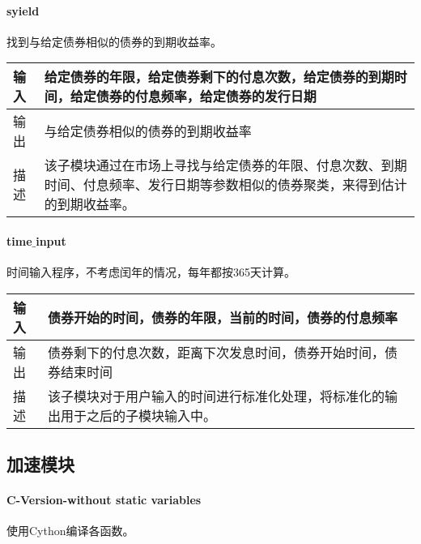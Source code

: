 \paragraph{syield}
找到与给定债券相似的债券的到期收益率。
\begin{table}[H]
\begin{adjustwidth}{-3cm}{-3cm}
\begin{center}
\begin{tabular}{|p{}| p{}|} \hline
输入 & 给定债券的年限，给定债券剩下的付息次数，给定债券的到期时间，给定债券的付息频率，给定债券的发行日期  \\ \hline
输出 & 与给定债券相似的债券的到期收益率 \\ \hline
描述 & 该子模块通过在市场上寻找与给定债券的年限、付息次数、到期时间、付息频率、发行日期等参数相似的债券聚类，来得到估计的到期收益率。 \\ \hline
\end{tabular}
\end{center}
\end{adjustwidth}
\end{table}


\paragraph{time$\_$input}
时间输入程序，不考虑闰年的情况，每年都按365天计算。
\begin{table}[H]
\begin{adjustwidth}{-3cm}{-3cm}
\begin{center}
\begin{tabular}{|p{}| p{}|} \hline
输入 & 债券开始的时间，债券的年限，当前的时间，债券的付息频率  \\ \hline
输出 & 债券剩下的付息次数，距离下次发息时间，债券开始时间，债券结束时间 \\ \hline
描述 &  该子模块对于用户输入的时间进行标准化处理，将标准化的输出用于之后的子模块输入中。\\ \hline
\end{tabular}
\end{center}
\end{adjustwidth}
\end{table}


\subsection{加速模块}
\paragraph{C-Version-without static variables}
使用Cython编译各函数。

